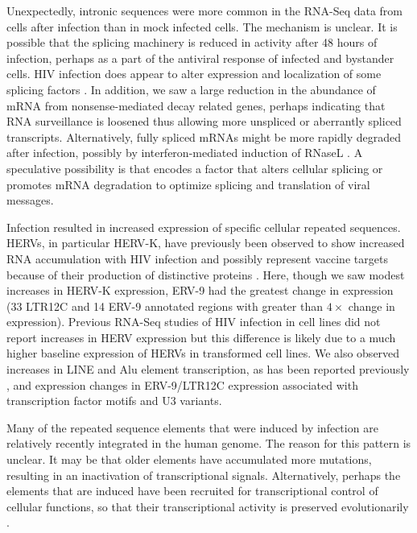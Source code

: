\documentclass[../sherrill-Mix_thesis.tex]{subfiles}
\begin{document}
	Unexpectedly, intronic sequences were more common in the RNA-Seq data from cells after \hivEight{} infection than in mock infected cells.  The mechanism is unclear.  It is possible that the splicing machinery is reduced in activity after 48 hours of infection, perhaps as a part of the antiviral response of infected and bystander cells.  HIV infection does appear to alter expression and localization of some splicing factors \citep{Dowling2008,Monette2009}. In addition, we saw a large reduction in the abundance of mRNA from nonsense-mediated decay related genes, perhaps indicating that RNA surveillance is loosened thus allowing more unspliced or aberrantly spliced transcripts.  Alternatively, fully spliced mRNAs might be more rapidly degraded after infection, possibly by interferon-mediated induction of RNaseL \citep{Al-Ahmadi2009}.  A speculative possibility is that \hivEight{} encodes a factor that alters cellular splicing or promotes mRNA degradation to optimize splicing and translation of viral messages.

	Infection resulted in increased expression of specific cellular repeated sequences. HERVs, in particular HERV-K, have previously been observed to show increased RNA accumulation with HIV infection \citep{Contreras-Galindo2007,Jones2012,Contreras-Galindo2013,Bhardwaj2014} and possibly represent vaccine targets because of their production of distinctive proteins \citep{Boller1997,Buescher2005,Garrison2007,Tandon2011,SenGupta2011,Jones2012}.  Here, though we saw modest increases in HERV-K expression, ERV-9 had the greatest change in expression (33 LTR12C and 14 ERV-9 annotated regions with greater than $4\times$ change in expression). Previous RNA-Seq studies of HIV infection in cell lines did not report increases in HERV expression \citep{Chang2011,Lefebvre2011} but this difference is likely due to a much higher baseline expression of HERVs in transformed cell lines. We also observed increases in LINE and Alu element transcription, as has been reported previously \citep{Jones2013}, and expression changes in ERV-9/LTR12C expression associated with transcription factor motifs and U3 variants.

	Many of the repeated sequence elements that were induced by \hivEight{} infection are relatively recently integrated in the human genome.  The reason for this pattern is unclear.  It may be that older elements have accumulated more mutations, resulting in an inactivation of transcriptional signals.  Alternatively, perhaps the elements that are induced have been recruited for transcriptional control of cellular functions, so that their transcriptional activity is preserved evolutionarily  \citep{Ling2002,Pi2004,Zhang2006}.
\end{document}
